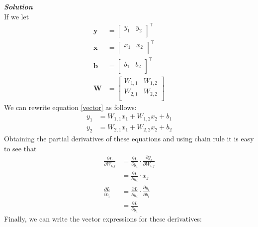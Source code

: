 \documentclass{article}
\begin{document}
\textbf{\emph{Solution}}\\
If we let 
\begin{align*}
    \bm{y} &= \begin{bmatrix} y_1 & y_2 \\ \end{bmatrix}^\top \\
    \bm{x} &= \begin{bmatrix} x_1 & x_2 \\ \end{bmatrix}^\top \\
    \bm{b} &= \begin{bmatrix} b_1 & b_2 \\ \end{bmatrix}^\top \\
    \bm{W} &= \begin{bmatrix}
                    W_{1,1} & W_{1,2} \\
                    W_{2,1} & W_{2,2} \\
                \end{bmatrix}
\end{align*}
We can rewrite equation \ref{vector} as follows:
\begin{align*}
    y_1 &= W_{1,1}x_1 + W_{1,2}x_2 + b_1 \\
    y_2 &= W_{2,1}x_1 + W_{2,2}x_2 + b_2
\end{align*}
Obtaining the partial derivatives of these equations and using chain rule it is easy to see that
\begin{align*}
    \frac{\partial L}{\partial W_{i,j}} &= \frac{\partial L}{\partial y_{i}} \cdot \frac{\partial y_i}{\partial W_{i,j}} \\
    &= \frac{\partial L}{\partial y_{i}} \cdot x_j \\
    \frac{\partial L}{\partial b_{i}} &= \frac{\partial L}{\partial y_{i}} \cdot \frac{\partial y_i}{\partial b_{i}} \\
    &= \frac{\partial L}{\partial y_{i}}
\end{align*}
Finally, we can write the vector expressions for these derivatives:
\end{document}

